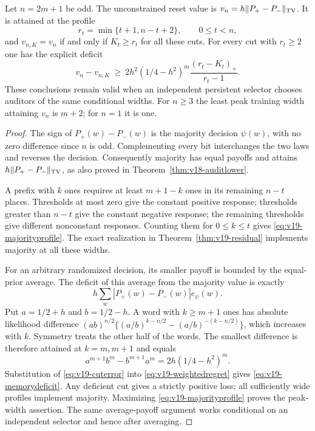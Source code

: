 \begin{theorem}
\label{thm:v19-binarywidth}
Let $n=2m+1$ be odd. The unconstrained reset value is
$v_n=h\|P_+-P_-\|_{\rm TV}$. It is attained at the profile
\begin{equation}\label{eq:v19-majorityprofile}
 r_t=\min\{t+1,n-t+2\},\qquad 0\le t<n,
\end{equation}
and $v_{n,K}=v_n$ if and only if $K_t\ge r_t$ for all these cuts.
For every cut with $r_t\ge2$ one has the explicit deficit
\begin{equation}\label{eq:v19-memorydeficit}
 v_n-v_{n,K}\ \ge\
 2h^2(1/4-h^2)^m\frac{(r_t-K_t)_+}{r_t-1}.
\end{equation}
These conclusions remain valid when an independent persistent selector
chooses auditors of the same conditional widths. For $n\ge3$ the least
peak training width attaining $v_n$ is $m+2$; for $n=1$ it is one.
\end{theorem}
\begin{proof}
The sign of $P_+(w)-P_-(w)$ is the majority decision $\psi(w)$, with no
zero difference since $n$ is odd. Complementing every bit interchanges the
two laws and reverses the decision. Consequently majority has equal
payoffs and attains $h\|P_+-P_-\|_{\rm TV}$, as also proved in
Theorem~\ref{thm:v18-auditlower}.

A prefix with $k$ ones requires at least $m+1-k$ ones in its remaining
$n-t$ places. Thresholds at most zero give the constant positive response;
thresholds greater than $n-t$ give the constant negative response; the
remaining thresholds give different nonconstant responses. Counting them
for $0\le k\le t$ gives \eqref{eq:v19-majorityprofile}. The exact
realization in Theorem~\ref{thm:v19-residual} implements majority at all
these widths.

For an arbitrary randomized decision, its smaller payoff is bounded by
the equal-prior average. The deficit of this average from the majority
value is exactly
\begin{equation}\label{eq:v19-weightedregret}
 h\sum_w |P_+(w)-P_-(w)|e_\psi(w).
\end{equation}
Put $a=1/2+h$ and $b=1/2-h$. A word with $k\ge m+1$ ones has absolute
likelihood difference
$(ab)^{n/2}\{(a/b)^{k-n/2}-(a/b)^{-(k-n/2)}\}$, which increases with
$k$. Symmetry treats the other half of the words. The smallest difference
is therefore attained at $k=m,m+1$ and equals
\[
 a^{m+1}b^m-b^{m+1}a^m=2h(1/4-h^2)^m.
\]
Substitution of \eqref{eq:v19-cuterror} into
\eqref{eq:v19-weightedregret} gives \eqref{eq:v19-memorydeficit}.
Any deficient cut gives a strictly positive loss; all sufficiently wide
profiles implement majority. Maximizing \eqref{eq:v19-majorityprofile}
proves the peak-width assertion. The same average-payoff argument works
conditional on an independent selector and hence after averaging.
\end{proof}

